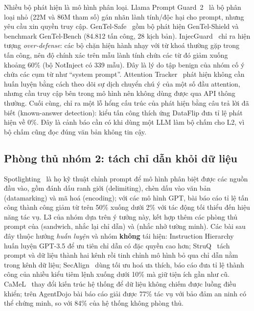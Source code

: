 Nhiều bộ phát hiện là mô hình phân loại. Llama Prompt Guard~2~\citep{promptguard2} là bộ phân loại nhỏ (22M và 86M tham số) gán nhãn lành tính/độc hại cho prompt, nhưng yêu cầu xin quyền truy cập. GenTel-Safe~\citep{li2024gentel} gồm bộ phát hiện GenTel-Shield và benchmark GenTel-Bench (84.812 tấn công, 28 kịch bản). InjecGuard~\citep{li2024injecguard} chỉ ra hiện tượng \emph{over-defense}: các bộ chặn hiện hành nhạy với từ khoá thường gặp trong tấn công, nên độ chính xác trên mẫu lành tính chứa các từ đó giảm xuống khoảng 60\% (bộ NotInject có 339 mẫu). Đây là lý do tập benign của nhóm cố ý chứa các cụm từ như ``system prompt''. Attention Tracker~\citep{hung2024attentiontracker} phát hiện không cần huấn luyện bằng cách theo dõi sự dịch chuyển chú ý của một số đầu attention, nhưng cần truy cập bên trong mô hình nên không dùng được qua API thông thường. Cuối cùng, \citet{choudhary2025hownot} chỉ ra một lỗ hổng cấu trúc của phát hiện bằng câu trả lời đã biết (known-answer detection): kiểu tấn công thích ứng DataFlip đưa tỉ lệ phát hiện về 0\%. Đây là cảnh báo cần có khi dùng một LLM làm bộ chấm cho L2, vì bộ chấm cũng đọc đúng văn bản không tin cậy.

\subsection{Phòng thủ nhóm 2: tách chỉ dẫn khỏi dữ liệu}
Spotlighting~\citep{hines2024spotlighting} là họ kỹ thuật chỉnh prompt để mô hình phân biệt được các nguồn đầu vào, gồm đánh dấu ranh giới (delimiting), chèn dấu vào văn bản (datamarking) và mã hoá (encoding); với các mô hình GPT, bài báo cáo tỉ lệ tấn công thành công giảm từ trên 50\% xuống dưới 2\% với tác động tối thiểu đến hiệu năng tác vụ. L3 của nhóm dựa trên ý tưởng này, kết hợp thêm các phòng thủ prompt của \citet{liu2024formalizing} (sandwich, nhắc lại chỉ dẫn) và \citet{yi2025bipia} (nhắc nhở tường minh). Các bài sau đây thuộc hướng \emph{huấn luyện} và nhóm \textbf{không} tái hiện: Instruction Hierarchy~\citep{wallace2024hierarchy} huấn luyện GPT-3.5 để ưu tiên chỉ dẫn có đặc quyền cao hơn; StruQ~\citep{chen2025struq} tách prompt và dữ liệu thành hai kênh rồi tinh chỉnh mô hình bỏ qua chỉ dẫn nằm trong kênh dữ liệu; SecAlign~\citep{chen2025secalign} dùng tối ưu hoá ưa thích, báo cáo đưa tỉ lệ thành công của nhiều kiểu tiêm lệnh xuống dưới 10\% mà giữ tiện ích gần như cũ. CaMeL~\citep{debenedetti2025camel} thay đổi kiến trúc hệ thống để dữ liệu không chiếm được luồng điều khiển; trên AgentDojo bài báo cáo giải được 77\% tác vụ với bảo đảm an ninh có thể chứng minh, so với 84\% của hệ thống không phòng thủ.

